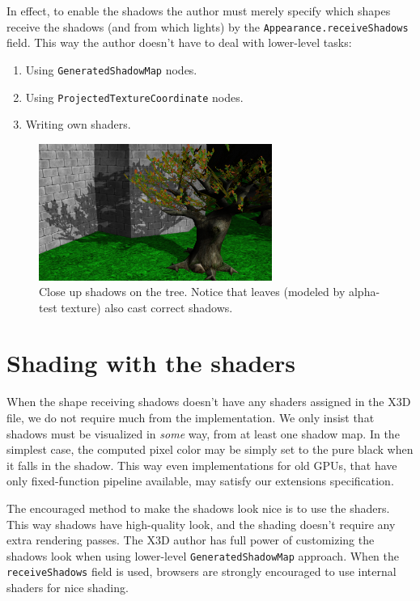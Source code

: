 \documentclass{acmsiggraph}                     %
\newenvironment{myenumerate}
{\begin{enumerate}
  \setlength{\itemsep}{0pt}
  \setlength{\parskip}{0pt}
  \setlength{\parsep}{0pt}}
{\end{enumerate}}
\begin{document}
In effect, to enable the shadows the author must merely
specify which shapes receive the shadows (and from which lights)
by the \texttt{Appearance.receiveShadows} field. This way the author
doesn't have to deal with lower-level tasks:

\begin{myenumerate}
\itemsep 0pt
\item Using \texttt{GeneratedShadowMap} nodes.
\item Using \texttt{ProjectedTextureCoordinate} nodes.
\item Writing own shaders.
\end{myenumerate}

\begin{figure}[H]
  \centering
  \includegraphics[width=3.0in]{sunny_street_tree_hard}
  \caption{Close up shadows on the tree. Notice that leaves (modeled by alpha-test texture) also cast correct shadows.}
\end{figure}

\section{Shading with the shaders}

When the shape receiving shadows doesn't have any shaders assigned in
the X3D file, we do not require much from the implementation.
We only insist that shadows must be visualized in \emph{some} way,
from at least one shadow map. In the simplest case,
the computed pixel color may be simply set to the pure black
when it falls in the shadow. This way even implementations
for old GPUs, that have only fixed-function pipeline available,
may satisfy our extensions specification.

The encouraged method to make the shadows look nice is to use the shaders.
This way shadows have high-quality look, and the shading doesn't require
any extra rendering passes. The X3D author has full power of customizing
the shadows look when using lower-level \texttt{GeneratedShadowMap}
approach. When the \texttt{receiveShadows} field is used,
browsers are strongly encouraged to use internal shaders for nice shading.
\end{document}
